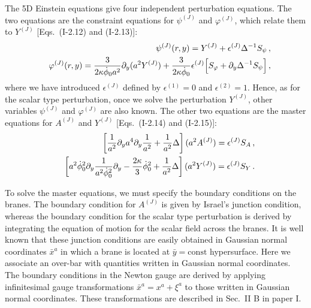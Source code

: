 \documentclass[a4paper,showpacs,preprintnumbers,amsmath,amssymb]{revtex4}
\begin{document}
The 5D Einstein equations give four independent perturbation equations.
The two equations are the constraint equations for $\psi^{(J)}$ and $\varphi^{(J)}$, which relate them to $Y^{(J)}$ [Eqs.~(I-2.12) and (I-2.13)]:
\begin{eqnarray}
   && \psi^{(J)} (r,y) = Y^{(J)} + \epsilon^{(J)} \Delta^{-1} S_\psi  \,,
\label{eq: phi^J=Y^J+...}
\\
   &&   \varphi^{(J)} (r,y)
    = \frac{3}{2\kappa \dot \phi_0 a^2}  \partial_y( a^2 Y^{(J)})
    + \frac{3}{2\kappa \dot \phi_0} \epsilon^{(J)} \Bigl[
      S_\varphi 
    + \partial_y \Delta^{-1} 
  S_\psi 
    \Bigr] \,,
    \label{eq:d varphi = Y^J +...}
\end{eqnarray}
where we have introduced $\epsilon^{(J)}$ defined by
$\epsilon^{(1)}=0$ and $\epsilon^{(2)}=1$.
Hence, as for the scalar type perturbation, once we solve the perturbation $Y^{(J)}$, other variables $\psi^{(J)}$ and $\varphi^{(J)}$ are also known. 
The other two equations are the master equations for $A^{(J)}$ and
$Y^{(J)}$ [Eqs.~(I-2.14) and (I-2.15)]:
\begin{eqnarray}
   &&  \left[   {1\over a^2}\partial_y a^4\partial_y {1\over a^2} +\frac{1}{a^2} \Delta 
       \right] (a^2A^{(J)})= \epsilon^{(J)} S_A \,,  
\label{eq:Ein-A^J}   
\\
   && \left[
     a^2\dot\phi_0^2\partial_y{1\over a^{2}\dot\phi_0^2}
      \partial_y  
    - {2\kappa\over 3} \dot\phi_0^2  + {1\over a^2} \Delta 
      \right] (a^2Y^{(J)} ) = \epsilon^{(J)} S_Y\,.
\label{eq:Ein-Y^J}
\end{eqnarray}



To solve the master equations, we must specify the boundary conditions on the branes.
The boundary condition for $A^{(J)}$ is given by Israel's junction condition, whereas the boundary condition for the scalar type perturbation is derived by integrating the equation of motion for the scalar field across the branes. It is well known that these junction conditions are easily obtained in Gaussian normal coordinates $\bar x^a$ in which a brane is located at $\bar y=\mathrm{const}$ hypersurface. 
Here we associate an over-bar with quantities written in Gaussian normal coordinates.  The boundary conditions in the Newton gauge are derived by applying infinitesimal gauge transformations $\bar x^a = x^a + \xi^a$ to those written in Gaussian normal coordinates.
These transformations are described in Sec.~II B in paper I. 
\end{document}
